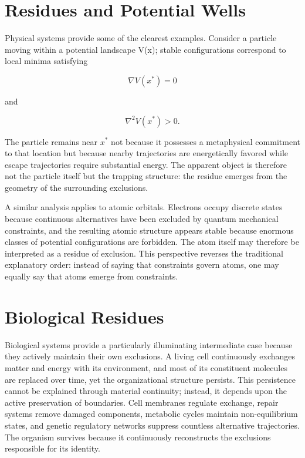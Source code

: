 \documentclass[11pt,oneside]{book}
\theoremstyle{plain}
\theoremstyle{definition}
\theoremstyle{remark}
\begin{document}
\section{Residues and Potential Wells}

Physical systems provide some of the clearest examples. Consider a particle moving within a potential landscape V(x); stable configurations correspond to local minima satisfying

\begin{equation}
\nabla V(x^\ast)=0
\end{equation}

and

\begin{equation}
\nabla^2 V(x^\ast)>0.
\end{equation}

The particle remains near \(x^\ast\) not because it possesses a metaphysical commitment to that location but because nearby trajectories are energetically favored while escape trajectories require substantial energy. The apparent object is therefore not the particle itself but the trapping structure: the residue emerges from the geometry of the surrounding exclusions.

A similar analysis applies to atomic orbitals. Electrons occupy discrete states because continuous alternatives have been excluded by quantum mechanical constraints, and the resulting atomic structure appears stable because enormous classes of potential configurations are forbidden. The atom itself may therefore be interpreted as a residue of exclusion. This perspective reverses the traditional explanatory order: instead of saying that constraints govern atoms, one may equally say that atoms emerge from constraints.

\section{Biological Residues}

Biological systems provide a particularly illuminating intermediate case because they actively maintain their own exclusions. A living cell continuously exchanges matter and energy with its environment, and most of its constituent molecules are replaced over time, yet the organizational structure persists. This persistence cannot be explained through material continuity; instead, it depends upon the active preservation of boundaries. Cell membranes regulate exchange, repair systems remove damaged components, metabolic cycles maintain non-equilibrium states, and genetic regulatory networks suppress countless alternative trajectories. The organism survives because it continuously reconstructs the exclusions responsible for its identity.
\end{document}

